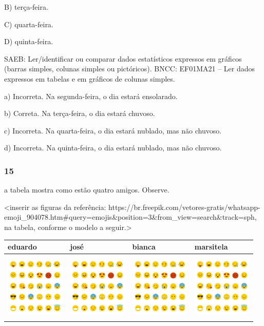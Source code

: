 B) terça-feira.

C) quarta-feira.

D) quinta-feira.

SAEB: Ler/identificar ou comparar dados estatísticos expressos
em gráficos (barras simples, colunas simples ou pictóricos).
BNCC: EF01MA21  -- Ler dados expressos em tabelas e em gráficos de colunas
simples.

a) Incorreta. Na segunda-feira, o dia estará ensolarado.

b) Correta. Na terça-feira, o dia estará chuvoso.

c) Incorreta. Na quarta-feira, o dia estará nublado, mas não chuvoso.

d) Incorreta. Na quinta-feira, o dia estará nublado, mas não chuvoso.

\subsubsection{15}\label{section-116}

a tabela mostra como estão quatro amigos. Observe.

\textless{}inserir as figuras da referência:
https://br.freepik.com/vetores-gratis/whatsapp-emoji\_904078.htm\#query=emojis\&position=3\&from\_view=search\&track=sph,
na tabela, conforme o modelo a seguir.\textgreater{}

\begin{longtable}[]{@{}llll@{}}
\toprule
eduardo & josé & bianca & marsitela\tabularnewline
\midrule
\endhead
\includegraphics[width=1.11765in,height=1.26042in]{media/image139.jpg} &
\includegraphics[width=1.11765in,height=1.26042in]{media/image139.jpg} &
\includegraphics[width=1.11765in,height=1.12806in]{media/image139.jpg} &
\includegraphics[width=1.11765in,height=1.12806in]{media/image139.jpg}\tabularnewline
\bottomrule
\end{longtable}

